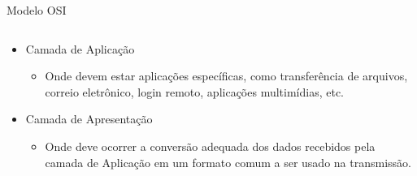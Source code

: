 \documentclass{libs/ufc_format}
\begin{document}
\begin{frame}{Modelo OSI}
\begin{columns}
        \begin{column}{0.65\textwidth}
            \begin{itemize}
                \item Camada de Aplicação
                    \begin{itemize}
                        \justifying
                        \item<2> Onde devem estar aplicações específicas, como transferência de arquivos, correio eletrônico, login remoto, aplicações multimídias, etc.
                    \end{itemize}
                \item<3-> Camada de Apresentação
                    \begin{itemize}
                        \justifying
                        \item<4> Onde deve ocorrer a conversão adequada dos dados recebidos pela camada de Aplicação em um formato comum a ser usado na transmissão.
                    \end{itemize}
            \end{itemize}
        \end{column}
    \end{columns}
\end{frame}
\end{document}
